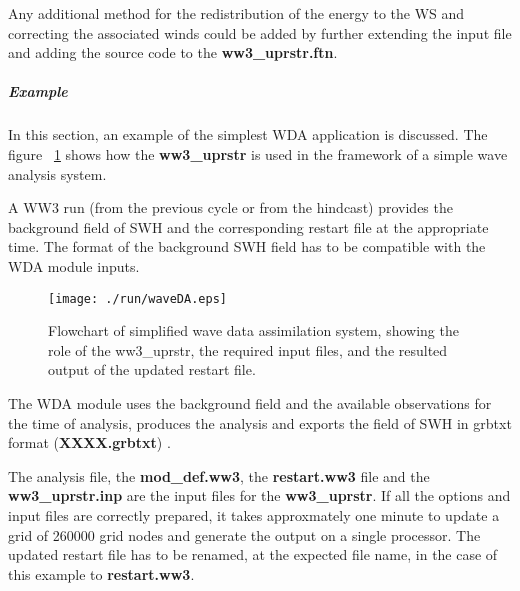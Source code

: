 Any additional method for the redistribution of the energy to the WS and correcting 
the associated winds could be added by further extending the input file and adding 
the source code to the \textbf{ww3\_uprstr.ftn}.

\subparagraph{Example \newline}
In this section, an example of the simplest WDA application is discussed.
The figure ~\ref{fig:waveDAflowchart} shows how the \textbf{ww3\_uprstr} 
is used in the framework of a simple wave analysis system. \newline

A WW3 run (from the previous cycle or from the hindcast) provides the
background field of SWH and the corresponding restart file at the appropriate time. 
The format of the background SWH field has to be compatible with the WDA module inputs.

\begin{figure} \begin{center}
\texttt{[image: ./run/waveDA.eps]}
\caption{Flowchart of simplified wave data assimilation system, 
showing the role of the {ww3\_uprstr}, the required input files,
and the resulted output of the updated restart file.}
\label{fig:waveDAflowchart} \botline
\end{center}
\end{figure}

The WDA module uses the background field and the available observations
for the time of analysis, produces the analysis and exports 
the field of SWH in grbtxt format (\textbf{XXXX.grbtxt}) .

The analysis file, the \textbf{mod\_def.ww3}, the \textbf{restart.ww3} file and 
the \textbf{ww3\_uprstr.inp} are the input files for the \textbf{ww3\_uprstr}. 
If all the options and input files are correctly prepared, it takes approxmately 
one minute to update a grid of 260000 grid nodes and generate the output on a single processor. 
The updated restart file has to be renamed, at the expected file name, in the case of this
example to \textbf{restart.ww3}. \newline  

   \noindent{}


\pb
